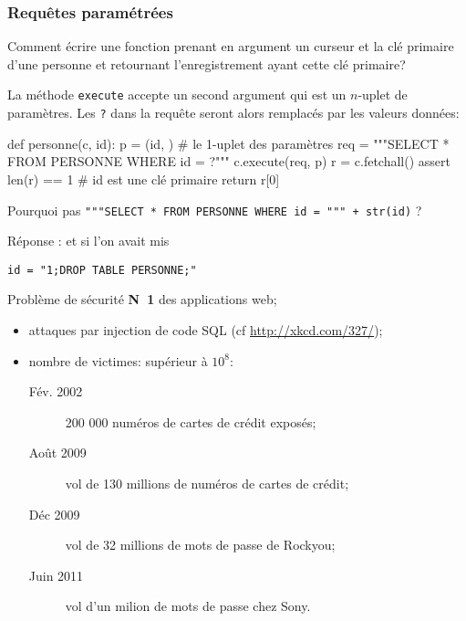 \subsubsection{Requêtes paramétrées}

Comment écrire une fonction prenant en argument un curseur et la clé
primaire d'une personne et retournant l'enregistrement ayant cette clé
primaire?

La méthode \lstinline{execute} accepte un second argument qui est
un $n$-uplet de paramètres. Les \og{}\texttt{?}\fg{} dans la requête
seront alors remplacés par les valeurs données:
\begin{pyverbatim}
def personne(c, id):
  p = (id, ) # le 1-uplet des paramètres
  req = """SELECT * FROM PERSONNE WHERE id = ?"""
  c.execute(req, p)
  r = c.fetchall()
  assert len(r) == 1 # id est une clé primaire
  return r[0]
\end{pyverbatim}

Pourquoi pas {\small 
\lstinline{"""SELECT * FROM PERSONNE WHERE id = """ + str(id)}
}?

Réponse : et si l'on avait mis 
\begin{verbatim}
id = "1;DROP TABLE PERSONNE;"
\end{verbatim}

Problème de sécurité \textbf{N~1} des applications web;
\begin{itemize}
\item attaques par injection de code SQL
(cf
\url{http://xkcd.com/327/});
\item nombre de victimes: supérieur à $10^{8}$:
  \begin{description}
  \item[Fév. 2002] 200 000 numéros de cartes de crédit exposés;
  \item[Août 2009] vol de 130 millions de numéros de cartes de crédit;
  \item[Déc 2009] vol de 32 millions de mots de passe de Rockyou;
  \item[Juin 2011] vol d'un milion de mots de passe chez Sony.
  \end{description}
\end{itemize}